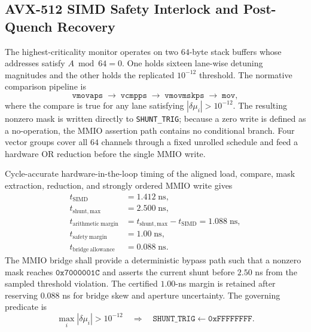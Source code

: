 \documentclass[10pt,twocolumn]{IEEEtran}
\begin{document}
\subsection{AVX-512 SIMD Safety Interlock and Post-Quench Recovery}

The highest-criticality monitor operates on two $64$-byte stack buffers whose addresses satisfy $A\bmod64=0$.  One holds sixteen lane-wise detuning magnitudes and the other holds the replicated $10^{-12}$ threshold.  The normative comparison pipeline is
\begin{equation}
\mathtt{vmovaps}\;\rightarrow\;
\mathtt{vcmpps}\;\rightarrow\;
\mathtt{vmovmskps}\;\rightarrow\;
\mathtt{mov},
\label{eq:avx512_interlock_pipeline}
\end{equation}
where the compare is true for any lane satisfying $|\delta\mu_i|>10^{-12}$.  The resulting nonzero mask is written directly to \texttt{SHUNT\_TRIG}; because a zero write is defined as a no-operation, the MMIO assertion path contains no conditional branch.  Four vector groups cover all $64$ channels through a fixed unrolled schedule and feed a hardware OR reduction before the single MMIO write.

Cycle-accurate hardware-in-the-loop timing of the aligned load, compare, mask
extraction, reduction, and strongly ordered MMIO write gives
\begin{equation}
\begin{aligned}
t_{\mathrm{SIMD}}&=1.412\;\mathrm{ns}, \\
t_{\mathrm{shunt,max}}&=2.500\;\mathrm{ns}, \\
t_{\mathrm{arithmetic\ margin}}
&=t_{\mathrm{shunt,max}}-t_{\mathrm{SIMD}}
=1.088\;\mathrm{ns}, \\
t_{\mathrm{safety\ margin}}&=1.00\;\mathrm{ns}, \\
t_{\mathrm{bridge\ allowance}}&=0.088\;\mathrm{ns}.
\end{aligned}
\label{eq:sec5_interlock_margin}
\end{equation}
The MMIO bridge shall provide a deterministic bypass path such that a nonzero mask reaches $\mathtt{0x7000001C}$ and asserts the current shunt before $2.50$ ns from the sampled threshold violation.  The certified $1.00$-ns margin is retained after reserving $0.088$ ns for bridge skew and aperture uncertainty.  The governing predicate is
\begin{equation}
\max_i|\delta\mu_i|>10^{-12}
\quad\Longrightarrow\quad
\texttt{SHUNT\_TRIG}\leftarrow\mathtt{0xFFFFFFFF}.
\label{eq:branchless_shunt_predicate}
\end{equation}
\end{document}
